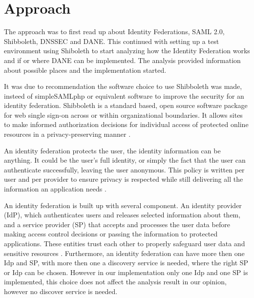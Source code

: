 \section{Approach}

The approach was to first read up about Identity Federations, SAML 2.0, Shibboleth, DNSSEC and DANE. This continued with setting up a test environment using Shiboleth to start analyzing how the Identity Federation works and if or where DANE can be implemented. The analysis provided information about possible places and the implementation started.  

It was due to recommendation the software choice to use Shibboleth was made, insteed of simpleSAMLphp or equivalent software to improve the security for an identity federation. Shibboleth is a standard based, open source software package for web single sign-on across or within organizational boundaries. It allows sites to make informed authorization decisions for individual access of protected online resources in a privacy-preserving manner \cite{website:Shibboleth}.

An identity federation protects the user, the identity information can be anything. It could be the user's full identity, or simply the fact that the user can authenticate successfully, leaving the user anonymous. This policy is written per user and per provider to ensure privacy is respected while still delivering all the information an application needs \cite{website:ShibbolethHighLevelIntro}.

An identity federation is built up with several component. An identity provider (IdP), which authenticates users and releases selected information about them, and a service provider (SP) that accepts and processes the user data before making access control decisions or passing the information to protected applications. These entities trust each other to properly safeguard user data and sensitive resources \cite{website:ShibbolethHighLevelIntro}. Furthermore,  an identity federation can have more then one Idp and SP, with more then one a discovery service is needed, where the right SP or Idp can be chosen. However in our implementation only one Idp and one SP is implemented, this choice does not affect the analysis result in our opinion, however no discover service is needed. 



